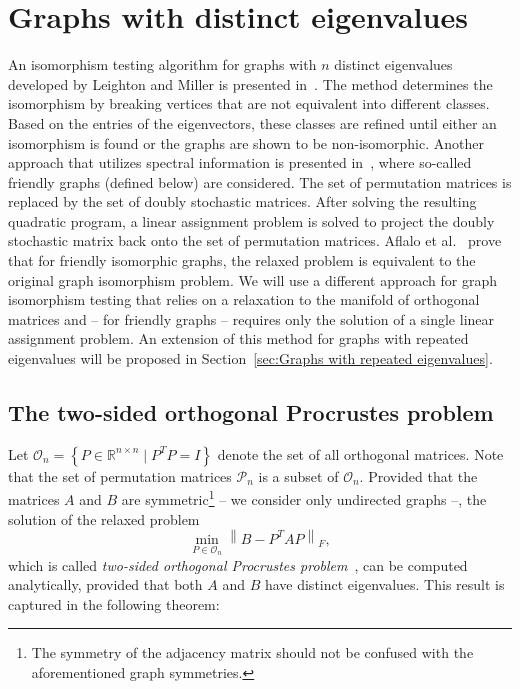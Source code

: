 \documentclass
[
    a4paper,
    DIV=11,
    abstracton
]
{scrartcl}
\newcommand{\R}{\mathbb{R}}
\providecommand{\norm}[1]{\left\lVert #1 \right\rVert}
\theoremstyle{definition}
\begin{document}
\section{Graphs with distinct eigenvalues}
\label{sec:Graphs with distinct eigenvalues}

An isomorphism testing algorithm for graphs with $ n $ distinct eigenvalues developed by Leighton and Miller is presented in~\cite{Spi09, LM79}. The method determines the isomorphism by breaking vertices that are not equivalent into different classes. Based on the entries of the eigenvectors, these classes are refined until either an isomorphism is found or the graphs are shown to be non-isomorphic. Another approach that utilizes spectral information is presented in~\cite{ABK15}, where so-called friendly graphs (defined below) are considered. The set of permutation matrices is replaced by the set of doubly stochastic matrices. After solving the resulting quadratic program, a linear assignment problem is solved to project the doubly stochastic matrix back onto the set of permutation matrices. Aflalo et al.\ \cite{ABK15} prove that for friendly isomorphic graphs, the relaxed problem is equivalent to the original graph isomorphism problem. We will use a different approach for graph isomorphism testing that relies on a relaxation to the manifold of orthogonal matrices and -- for friendly graphs -- requires only the solution of a single linear assignment problem. An extension of this method for graphs with repeated eigenvalues will be proposed in Section~\ref{sec:Graphs with repeated eigenvalues}.

\subsection{The two-sided orthogonal Procrustes problem}

Let $ \mathcal{O}_n = \left\{ P \in \R^{n \times n} \mid P^T P = I \right\} $ denote the set of all orthogonal matrices. Note that the set of permutation matrices $ \mathcal{P}_n $ is a subset of $ \mathcal{O}_n $. Provided that the matrices $ A $ and $ B $ are symmetric\footnote{The symmetry of the adjacency matrix should not be confused with the aforementioned graph symmetries.} -- we consider only undirected graphs --, the solution of the relaxed problem
\begin{equation} \label{eq:RGIP}
    \min_{P \in \mathcal{O}_n} \norm{ B - P^T A P }_F,
\end{equation}
which is called \emph{two-sided orthogonal Procrustes problem}~\cite{Sch68, GD04}, can be computed analytically, provided that both $ A $ and $ B $ have distinct eigenvalues. This result is captured in the following theorem:
\end{document}
